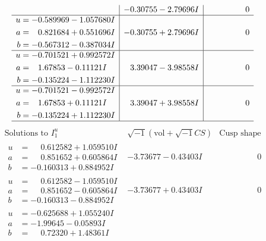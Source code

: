 \documentclass[1p]{elsarticle_modified}
\theoremstyle{definition}
\newcommand{\I}{\sqrt{-1}}
\begin{document}
$$\begin{array}{c|c|c}
 & -0.30755 - 2.79696 I & \phantom{-0.000000 } 0 \\ \hline\begin{aligned}
u &= -0.589969 - 1.057680 I \\
a &= \phantom{-}0.821684 + 0.551696 I \\
b &= -0.567312 - 0.387034 I\end{aligned}
 & -0.30755 + 2.79696 I & \phantom{-0.000000 } 0 \\ \hline\begin{aligned}
u &= -0.701521 + 0.992572 I \\
a &= \phantom{-}1.67853 - 0.11121 I \\
b &= -0.135224 - 1.112230 I\end{aligned}
 & \phantom{-}3.39047 - 3.98558 I & \phantom{-0.000000 } 0 \\ \hline\begin{aligned}
u &= -0.701521 - 0.992572 I \\
a &= \phantom{-}1.67853 + 0.11121 I \\
b &= -0.135224 + 1.112230 I\end{aligned}
 & \phantom{-}3.39047 + 3.98558 I & \phantom{-0.000000 } 0\\
 \hline 
 \end{array}$$\newpage$$\begin{array}{c|c|c}  
\text{Solutions to }I^u_{1}& \I (\text{vol} + \sqrt{-1}CS) & \text{Cusp shape}\\
 \hline 
\begin{aligned}
u &= \phantom{-}0.612582 + 1.059510 I \\
a &= \phantom{-}0.851652 + 0.605864 I \\
b &= -0.160313 + 0.884952 I\end{aligned}
 & -3.73677 - 0.43403 I & \phantom{-0.000000 } 0 \\ \hline\begin{aligned}
u &= \phantom{-}0.612582 - 1.059510 I \\
a &= \phantom{-}0.851652 - 0.605864 I \\
b &= -0.160313 - 0.884952 I\end{aligned}
 & -3.73677 + 0.43403 I & \phantom{-0.000000 } 0 \\ \hline\begin{aligned}
u &= -0.625688 + 1.055240 I \\
a &= -1.99645 - 0.05893 I \\
b &= \phantom{-}0.72320 + 1.48361 I\end{aligned}

\end{array}$$
\end{document}
